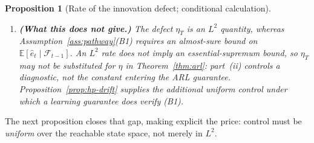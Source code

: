 \documentclass[bj,authoryear]{imsart}
\theoremstyle{plain}
\newtheorem{proposition}[theorem]{Proposition}
\theoremstyle{definition}
\newcommand{\E}{\mathbb{E}}
\newcommand{\F}{\mathcal{F}}
\newcommand{\given}{\mid}
\begin{document}
\begin{proposition}[Rate of the innovation defect; conditional calculation]
\begin{enumerate}[label=(\roman*), itemsep=3pt]
      $\E\,\eta_T = O\!\bigl((T/\log T)^{-s/(2s+1)}\bigr)
       =\widetilde O\!\bigl(T^{-s/(2s+1)}\bigr)$.
      Both bounds are \emph{hypotheses}: the cited results do not establish
      these exact rates for the recurrent class used here, whose parameter
      count grows faster than $W$ and for which mixing enters through an
      effective sample size.
    \item \textbf{(What this does \emph{not} give.)}  The defect $\eta_T$ is an
      $L^2$ quantity, whereas Assumption~\ref{ass:pathway}(B1) requires an
      \emph{almost-sure} bound on $\E[\hat e_t\given\F_{t-1}]$.  An $L^2$ rate
      does not imply an essential-supremum bound, so $\eta_T$ may \emph{not} be
      substituted for $\eta$ in Theorem~\ref{thm:arl}: part~(ii) controls a
      diagnostic, not the constant entering the ARL guarantee.
      Proposition~\ref{prop:hp-drift} supplies the additional uniform control
      under which a learning guarantee does verify (B1).
  \end{enumerate}
\end{proposition}

The next proposition closes that gap, making explicit the price: control must be
\emph{uniform} over the reachable state space, not merely in $L^2$.
\end{document}
